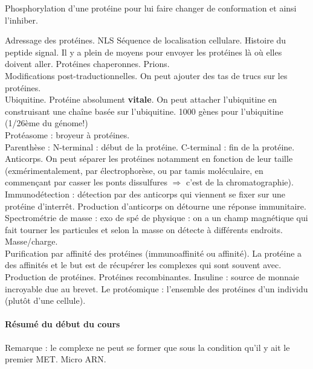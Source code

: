 \documentclass[10pt,a4paper]{article}
\begin{document}
Phosphorylation d'une protéine pour lui faire changer de conformation et ainsi l'inhiber.

Adressage des protéines. NLS Séquence de localisation cellulare. Histoire du peptide signal. Il y a plein de moyens pour envoyer les protéines là où elles doivent aller. Protéines chaperonnes. Prions.\\

Modifications post-traductionnelles. On peut ajouter des tas de trucs sur les protéines. \\

Ubiquitine. Protéine absolument \textbf{vitale}. On peut attacher l'ubiquitine en construisant une chaîne basée sur l'ubiquitine.  1000 gènes pour l'ubiquitine (1/26ème du génome!) \\
Protéasome : broyeur à protéines.\\

Parenthèse : N-terminal : début de la protéine. C-terminal : fin de la protéine.\\

Anticorps. On peut séparer les protéines notamment en fonction de leur taille (exmérimentalement, par électrophorèse, ou par tamis moléculaire, en commençant par casser les ponts dissulfures $\Rightarrow$ c'est de la chromatographie).\\

Immunodétection : détection par des anticorps qui viennent se fixer sur une protéine d'interrêt. Production d'anticorps on détourne une réponse immunitaire.\\

Spectrométrie de masse : exo de spé de physique : on a un champ magnétique qui fait tourner les particules et selon la masse on détecte à différents endroits. Masse/charge. \\

Purification par affinité des protéines (immunoaffinité ou affinité). La protéine a des affinités et le but est de récupérer les complexes qui sont souvent avec. \\

Production de protéines. Protéines recombinantes. Insuline : source de monnaie incroyable due au brevet. Le protéomique : l'ensemble des protéines d'un individu (plutôt d'une cellule).\\


\paragraph{Résumé du début du cours}
Remarque : le complexe ne peut se former que sous la condition qu'il y ait le premier MET. Micro ARN.
\end{document}
